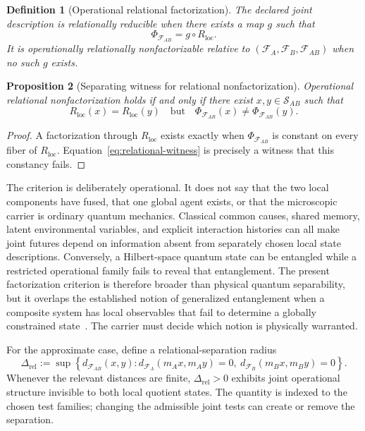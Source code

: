 \documentclass[11pt]{article}
\newtheorem{definition}{Definition}
\newtheorem{proposition}[definition]{Proposition}
\newcommand{\F}{\mathcal F}
\newcommand{\Sspace}{\mathcal S}
\begin{document}
\begin{definition}[Operational relational factorization]
The declared joint description is \emph{relationally reducible} when there exists a map $g$ such that
\begin{equation}
  \Phi_{\F_{AB}}
  =
  g\circ R_{\mathrm{loc}}.
  \label{eq:relational-factorization}
\end{equation}
It is \emph{operationally relationally nonfactorizable} relative to $(\F_A,\F_B,\F_{AB})$ when no such $g$ exists.
\end{definition}

\begin{proposition}[Separating witness for relational nonfactorization]
\label{prop:relational-witness}
Operational relational nonfactorization holds if and only if there exist $x,y\in\Sspace_{AB}$ such that
\begin{equation}
  R_{\mathrm{loc}}(x)=R_{\mathrm{loc}}(y)
  \quad\text{but}\quad
  \Phi_{\F_{AB}}(x)\neq\Phi_{\F_{AB}}(y).
  \label{eq:relational-witness}
\end{equation}
\end{proposition}

\begin{proof}
A factorization through $R_{\mathrm{loc}}$ exists exactly when $\Phi_{\F_{AB}}$ is constant on every fiber of $R_{\mathrm{loc}}$. Equation~\eqref{eq:relational-witness} is precisely a witness that this constancy fails.
\end{proof}

The criterion is deliberately operational. It does not say that the two local components have fused, that one global agent exists, or that the microscopic carrier is ordinary quantum mechanics. Classical common causes, shared memory, latent environmental variables, and explicit interaction histories can all make joint futures depend on information absent from separately chosen local state descriptions. Conversely, a Hilbert-space quantum state can be entangled while a restricted operational family fails to reveal that entanglement. The present factorization criterion is therefore broader than physical quantum separability, but it overlaps the established notion of generalized entanglement when a composite system has local observables that fail to determine a globally constrained state~\cite{filkromer2011}. The carrier must decide which notion is physically warranted.

For the approximate case, define a relational-separation radius
\begin{equation}
  \Delta_{\mathrm{rel}}
  :=
  \sup\left\{
  d_{\F_{AB}}(x,y):
  d_{\F_A}(m_Ax,m_Ay)=0,
  \ d_{\F_B}(m_Bx,m_By)=0
  \right\}.
  \label{eq:relational-radius}
\end{equation}
Whenever the relevant distances are finite, $\Delta_{\mathrm{rel}}>0$ exhibits joint operational structure invisible to both local quotient states. The quantity is indexed to the chosen test families; changing the admissible joint tests can create or remove the separation.
\end{document}
